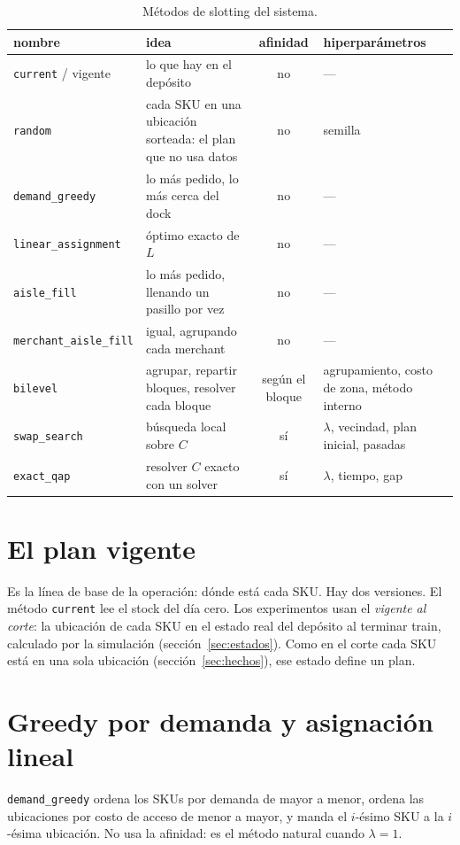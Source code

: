 \documentclass[11pt,a4paper,oneside]{report}
\newcommand{\code}[1]{\texttt{\small #1}}
\begin{document}
\begin{table}[ht]
\centering\small
\begin{tabularx}{\textwidth}{@{}l L c >{\raggedright\arraybackslash}p{4.4cm}@{}}
\toprule
nombre & idea & afinidad & hiperparámetros \\
\midrule
\code{current} / vigente & lo que hay en el depósito & no & --- \\
\code{random} & cada SKU en una ubicación sorteada: el plan que no usa datos & no & semilla \\
\code{demand\_greedy} & lo más pedido, lo más cerca del dock & no & --- \\
\code{linear\_assignment} & óptimo exacto de $L$ & no & --- \\
\code{aisle\_fill} & lo más pedido, llenando un pasillo por vez & no & --- \\
\code{merchant\_aisle\_fill} & igual, agrupando cada merchant & no & --- \\
\code{bilevel} & agrupar, repartir bloques, resolver cada bloque & según el bloque & agrupamiento, costo de zona, método interno \\
\code{swap\_search} & búsqueda local sobre $C$ & sí & $\lambda$, vecindad, plan inicial, pasadas \\
\code{exact\_qap} & resolver $C$ exacto con un solver & sí & $\lambda$, tiempo, gap \\
\bottomrule
\end{tabularx}
\caption{Métodos de slotting del sistema.}
\label{tab:metodos}
\end{table}

\section{El plan vigente}

Es la línea de base de la operación: dónde está cada SKU. Hay dos versiones. El método
\code{current} lee el stock del día cero. Los experimentos usan el \emph{vigente al corte}: la
ubicación de cada SKU en el estado real del depósito al terminar train, calculado por la
simulación (sección~\ref{sec:estados}). Como en el corte cada SKU está en una sola ubicación
(sección~\ref{sec:hechos}), ese estado define un plan.

\section{Greedy por demanda y asignación lineal}

\code{demand\_greedy} ordena los SKUs por demanda de mayor a menor, ordena las ubicaciones por
costo de acceso de menor a mayor, y manda el $i$-ésimo SKU a la $i$-ésima ubicación. No usa la
afinidad: es el método natural cuando $\lambda = 1$.
\end{document}
